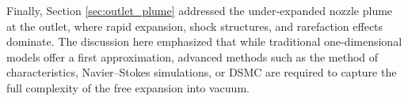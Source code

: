 

Finally, Section \ref{sec:outlet_plume} addressed the under-expanded nozzle plume at the outlet, where rapid expansion, shock structures, and rarefaction effects dominate.
The discussion here emphasized that while traditional one-dimensional models offer a first approximation, advanced methods such as the method of characteristics, Navier–Stokes simulations, or DSMC are required to capture the full complexity of the free expansion into vacuum.

\newpage

